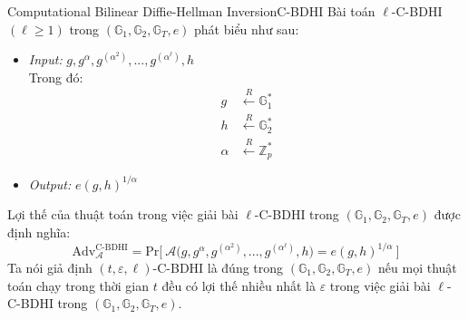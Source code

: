 \documentclass[class=report, crop=false]{standalone}
\begin{document}
		\begin{problem}{Computational Bilinear Diffie-Hellman Inversion}{C-BDHI}
			Bài toán $\ell$-C-BDHI $(\ell \geq 1)$ trong $(\mathbb{G}_1, \mathbb{G}_2, \mathbb{G}_T, e)$ phát biểu như sau:
			\vspace{-\baselineskip}
			\begin{itemize}[leftmargin=1.5cm, itemindent=-0.5cm]
				\item[] \textit{Input:} $g, g^\alpha, g^{(\alpha^2)}, ..., g^{(\alpha^\ell)}, h$ \\
				Trong đó: \vspace{-\baselineskip}
				\begin{align*}
					g 		&\xleftarrow{R} \mathbb{G}_1^* \\
					h 		&\xleftarrow{R} \mathbb{G}_2^* \\
					\alpha 	&\xleftarrow{R} \mathbb{Z}_p^*
				\end{align*}
				\item[] \textit{Output:} $e(g, h)^{1/\alpha}$
			\end{itemize}
			\vspace{-\baselineskip}\par
			Lợi thế của thuật toán \algo trong việc giải bài $\ell$-C-BDHI trong $(\mathbb{G}_1, \mathbb{G}_2, \mathbb{G}_T, e)$ được định nghĩa:
			\[
				\text{Adv}_{\mathcal{A}}^{\text{C-BDHI}} = \text{Pr}\bigg[ \ \mathcal{A}\Big(g, g^\alpha, g^{(\alpha^2)}, ..., g^{(\alpha^\ell)}, h \Big) = e(g, h)^{1/\alpha} \ \bigg]
			\] \indent
			Ta nói giả định $(t, \varepsilon, \ell)$-C-BDHI là đúng trong $(\mathbb{G}_1, \mathbb{G}_2, \mathbb{G}_T, e)$ nếu mọi thuật toán chạy trong thời gian $t$ đều có lợi thế nhiều nhất là $\varepsilon$ trong việc giải bài $\ell$-C-BDHI trong $(\mathbb{G}_1, \mathbb{G}_2, \mathbb{G}_T, e)$.
		\end{problem}
\end{document}
